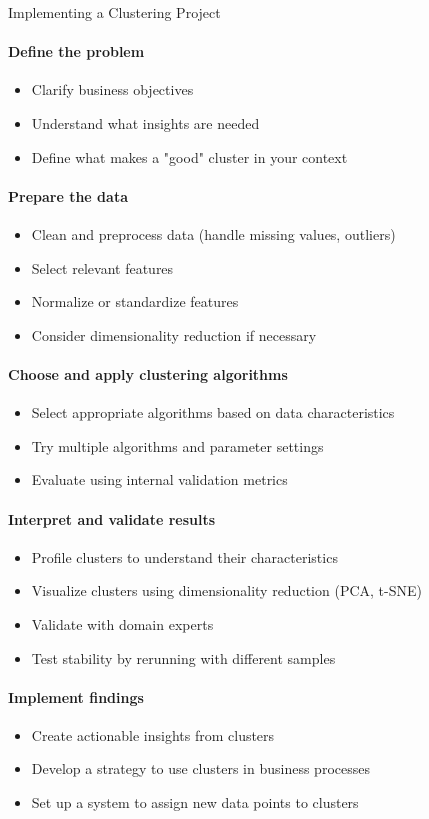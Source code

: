 \begin{KR}{Implementing a Clustering Project}\\
\paragraph{Define the problem}
\begin{itemize}
    \item Clarify business objectives
    \item Understand what insights are needed
    \item Define what makes a "good" cluster in your context
\end{itemize}

\paragraph{Prepare the data}
\begin{itemize}
    \item Clean and preprocess data (handle missing values, outliers)
    \item Select relevant features
    \item Normalize or standardize features
    \item Consider dimensionality reduction if necessary
\end{itemize}

\paragraph{Choose and apply clustering algorithms}
\begin{itemize}
    \item Select appropriate algorithms based on data characteristics
    \item Try multiple algorithms and parameter settings
    \item Evaluate using internal validation metrics
\end{itemize}

\paragraph{Interpret and validate results}
\begin{itemize}
    \item Profile clusters to understand their characteristics
    \item Visualize clusters using dimensionality reduction (PCA, t-SNE)
    \item Validate with domain experts
    \item Test stability by rerunning with different samples
\end{itemize}

\paragraph{Implement findings}
\begin{itemize}
    \item Create actionable insights from clusters
    \item Develop a strategy to use clusters in business processes
    \item Set up a system to assign new data points to clusters
\end{itemize}
\end{KR}
